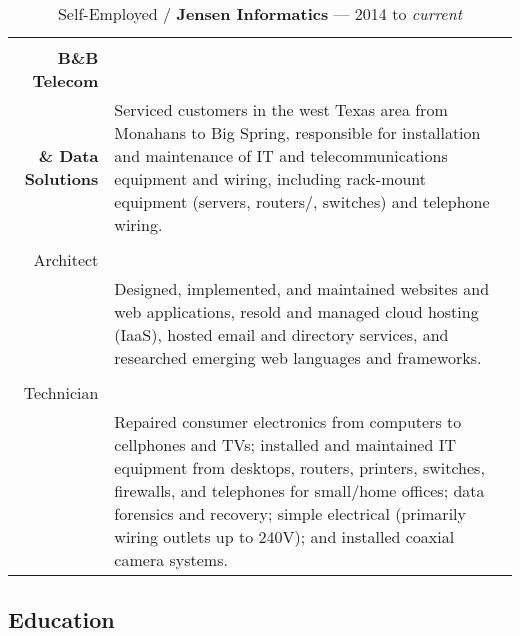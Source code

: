 \documentclass[letterpaper,]{article}
\begin{document}
\begin{table}[H]
\centering
	\caption{Self-Employed / \textbf{Jensen Informatics} --- 2014 to \emph{current}}
	\begin{tabularx}{\textwidth}{r|X}
		\begin{tabular}{@{}c@{}}
			Contractor, \\
			\fontsize{8}{10}\selectfont \textbf{B\&B Telecom} \\ 
			\fontsize{8}{10}\selectfont \textbf{\& Data Solutions}
		\end{tabular}
		& Serviced customers in the west Texas area from Monahans to Big Spring,
		responsible for installation and maintenance of IT and telecommunications
		equipment and wiring, including rack-mount equipment (servers, routers/,
		switches) and telephone wiring. \\
		\begin{tabular}{@{}r@{}}
			Web \\
			Architect \\
		\end{tabular}
		& Designed, implemented, and maintained websites and web applications, resold
		and managed cloud hosting (IaaS), hosted email and directory services, and
		researched emerging web languages and frameworks. \\

		\begin{tabular}{@{}r@{}}
			Service  \\
			Technician \\
		\end{tabular}
		& Repaired consumer electronics from computers to cellphones and TVs;
		installed and maintained IT equipment from desktops, routers, printers, 
		switches, firewalls, and telephones for small/home offices; data forensics
		and recovery; simple electrical (primarily wiring outlets up to 240V);
		and installed coaxial camera systems. \\
	\end{tabularx}
\end{table}

\subsection{Education}\label{education}
\end{document}
